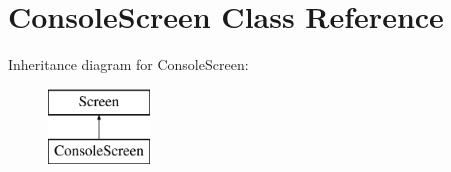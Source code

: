\hypertarget{classConsoleScreen}{}\section{Console\+Screen Class Reference}
\label{classConsoleScreen}
Inheritance diagram for Console\+Screen\+:\begin{figure}[H]
\begin{center}
\leavevmode
\includegraphics[height=2.000000cm]{classConsoleScreen}
\end{center}
\end{figure}
